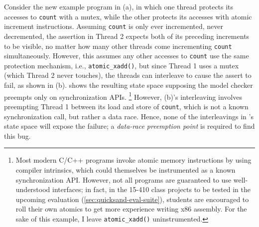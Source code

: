 {Consider the new example program in (a),
in which one thread protects its accesses to {\tt count} with a mutex,
while the other protects its accesses with atomic increment instructions.
Assuming {\tt count} is only ever incremented, never decremented,
the assertion in Thread 2 expects both of its preceding increments to be visible,
no matter how many other threads come incrementing %
{\tt count} simultaneously.
However, this assumes any other accesses to {\tt count} use the same protection mechanism,
i.e., {\tt atomic\_xadd()},
but since Thread 1 uses a mutex (which Thread 2 never touches),
the threads can interleave to cause the assert to fail,
as shown in (b).
%
 shows the resulting state space
supposing the model checker preempts only on synchronization APIs.%
\footnote{Most modern C/C++ programs invoke atomic memory instructions by using compiler intrinsics,
which could themselves be instrumented as a known synchronization API.
However, not all programs are guaranteed to use well-understood interfaces;
in fact, in the 15-410 class projects to be tested in the upcoming evaluation (\cref{sec:quicksand-eval-suite}),
students are encouraged to roll their own atomics to get more experience writing x86 assembly.
For the sake of this example, I leave {\tt atomic\_xadd()} uninstrumented.}
However, (b)'s interleaving involves
preempting Thread 1 between its load and store of {\tt count},
which is not a known synchronization call, but rather a data race.
Hence, none of the interleavings in 's state space
will expose the failure;
a {\em data-race preemption point} is required to find this bug.

}
